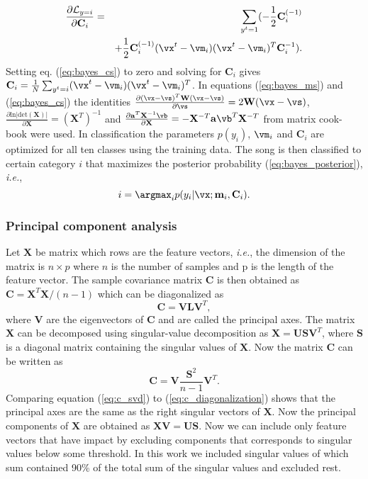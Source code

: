 \documentclass[aps,prb,10pt,twocolumn,groupedaddress]{revtex4-1}
\begin{document}
\begin{eqnarray}
  \frac{\partial{\mathcal{L}_{y=i}}}{\partial\mathbf{C}_i}&=&\sum_{y^t=1}(-\frac{1}{2}\mathbf{C}_i^{(-1)}\nonumber\\
  & &+\frac{1}{2}\mathbf{C}_i^{(-1)}(\vx^t-\vm_i)(\vx^t-\vm_i)^T\mathbf{C}_i^{-1}).
  \label{eq:bayes_cs}
\end{eqnarray}
Setting eq. (\ref{eq:bayes_cs}) to zero and solving for $\mathbf{C}_i$ gives
$\mathbf{C}_i=\frac{1}{N}\sum_{y^t=i}(\vx^t-\vm_i)(\vx^t-\vm_i)^T$. In equations
(\ref{eq:bayes_ms}) and (\ref{eq:bayes_cs}) the identities
$\frac{\partial(\vx-\vs)^T\mathbf{W}(\vx-\vs)}{\partial\vs} = 2\mathbf{W}(\vx-\vs)$, $\frac{\partial\mathrm{ln}|\mathrm{det}(\mathbf{X})|}{\partial\mathbf{X}}=(\mathbf{X}^T)^{-1}$ and  $\frac{\partial\mathbf{a}^T\mathbf{X}^{-1}\vb}{\partial\mathbf{X}}=-\mathbf{X}^{-T}\mathbf{a}\vb^T\mathbf{X}^{-T}$ from matrix cook-book
\cite{matrixcookbook}
were used. In classification the parameters $p(y_i)$, $\vm_i$ and $\mathbf{C}_i$
are optimized for all ten classes using the training data. The song is then
classified to certain category $i$ that maximizes the posterior probability
(\ref{eq:bayes_posterior}), \textit{i.e.},
\begin{equation}
  i = \argmax_i p(y_i|\vx;\mathbf{m}_{i},\mathbf{C}_{i}).
\end{equation}
\subsubsection{Principal component analysis}
\label{sec:principal_component}
Let $\mathbf{X}$ be matrix which rows are the feature vectors, \textit{i.e.},
the dimension of the matrix is $n\times p$ where $n$ is the number of samples
and p is the length of the feature vector.
The sample covariance matrix $\mathbf{C}$ is then obtained as
$\mathbf{C}=\mathbf{X}^T\mathbf{X}/(n-1)$ which can be diagonalized as
\begin{equation}
  \mathbf{C}=\mathbf{V}\mathbf{L}\mathbf{V}^T,
  \label{eq:c_diagonalization}
\end{equation}
where $\mathbf{V}$ are the eigenvectors of $\mathbf{C}$ and are called
the principal axes.
The matrix $\mathbf{X}$ can be decomposed using singular-value decomposition as
$\mathbf{X}=\mathbf{U}\mathbf{S}\mathbf{V}^T$, where $\mathbf{S}$ is a diagonal
matrix containing the singular values of $\mathbf{X}$. Now the matrix
$\mathbf{C}$ can be written as
\begin{equation}
  \mathbf{C} = \mathbf{V}\frac{\mathbf{S}^2}{n-1}\mathbf{V}^T.
  \label{eq:c_svd}
\end{equation}
Comparing equation (\ref{eq:c_svd}) to (\ref{eq:c_diagonalization}) shows that
the principal axes are the same as the right singular vectors of $\mathbf{X}$.
Now the principal components of $\mathbf{X}$ are obtained as
$\mathbf{X}\mathbf{V}=\mathbf{U}\mathbf{S}$. Now we can include only feature
vectors that have impact by excluding components that corresponds to singular
values below some threshold. In this work we included singular values of which
sum contained 90\% of the total sum of the singular values and excluded rest.
\end{document}
